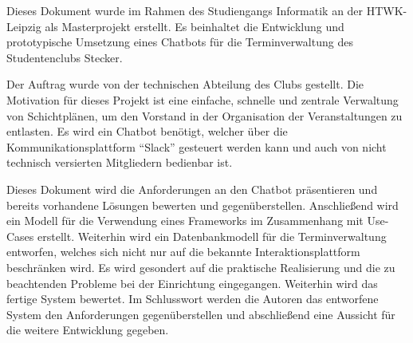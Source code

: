 Dieses Dokument wurde im Rahmen des Studiengangs Informatik an der HTWK-Leipzig als Masterprojekt erstellt. Es beinhaltet die Entwicklung und prototypische Umsetzung eines Chatbots für die Terminverwaltung des Studentenclubs \glqq Stecker\grqq .

Der Auftrag wurde von der technischen Abteilung des Clubs gestellt. Die Motivation für dieses Projekt ist eine einfache, schnelle und zentrale Verwaltung von Schichtplänen, um den Vorstand in der Organisation der Veranstaltungen zu entlasten.
Es wird ein Chatbot benötigt, welcher über die Kommunikationsplattform \enquote{Slack} gesteuert werden kann und auch von nicht technisch versierten Mitgliedern bedienbar ist.

Dieses Dokument wird die Anforderungen an den Chatbot präsentieren und bereits vorhandene Lösungen bewerten und gegenüberstellen. Anschließend wird ein Modell für die Verwendung eines Frameworks im Zusammenhang mit Use-Cases erstellt. Weiterhin wird ein Datenbankmodell für die Terminverwaltung entworfen, welches sich nicht nur auf die bekannte Interaktionsplattform beschränken wird. Es wird gesondert auf die praktische Realisierung und die zu beachtenden Probleme bei der Einrichtung eingegangen. Weiterhin wird das fertige System bewertet. Im Schlusswort werden die Autoren das entworfene System den Anforderungen gegenüberstellen und abschließend eine Aussicht für die weitere Entwicklung gegeben.
